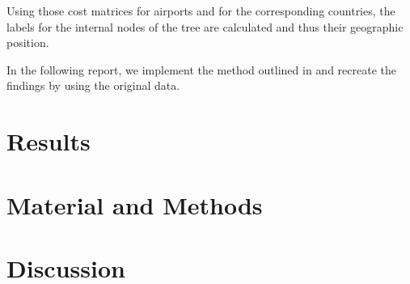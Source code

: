 \documentclass{article}
\begin{document}
Using those cost matrices for airports and for the corresponding countries, the
labels for the internal nodes of the tree are calculated and thus their
geographic position.

In the following report, we implement the method outlined in
\cite{reimeringPhylogeographicReconstructionUsing2020} and recreate the findings
by using the original data.

\section{Results}

\section{Material and Methods}

\section{Discussion}


  
\end{document}
